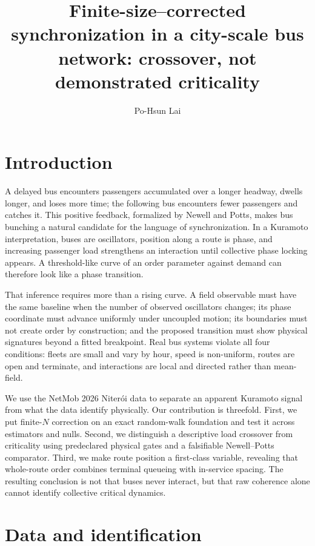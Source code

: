 \documentclass[9pt,twocolumn,twoside]{opticajnl}
\title{Finite-size--corrected synchronization in a city-scale bus network:
crossover, not demonstrated criticality}
\author[1,*]{Po-Hsun Lai}
\affil[1]{Department of Physics, National Taiwan University, Taipei, Taiwan}
\affil[*]{b11202025@ntu.edu.tw}
\begin{document}
\maketitle

\section{Introduction}

A delayed bus encounters passengers accumulated over a longer headway, dwells longer, and loses
more time; the following bus encounters fewer passengers and catches it.  This positive feedback,
formalized by Newell and Potts, makes bus bunching a natural candidate for the language of
synchronization.  In a Kuramoto interpretation, buses are oscillators, position along a route is
phase, and increasing passenger load strengthens an interaction until collective phase locking
appears.  A threshold-like curve of an order parameter against demand can therefore look like a
phase transition.

That inference requires more than a rising curve.  A field observable must have the same baseline
when the number of observed oscillators changes; its phase coordinate must advance uniformly under
uncoupled motion; its boundaries must not create order by construction; and the proposed transition
must show physical signatures beyond a fitted breakpoint.  Real bus systems violate all four
conditions: fleets are small and vary by hour, speed is non-uniform, routes are open and terminate,
and interactions are local and directed rather than mean-field.

We use the NetMob 2026 Niter\'oi data to separate an apparent Kuramoto signal from what the data
identify physically.  Our contribution is threefold.  First, we put finite-$N$ correction on an
exact random-walk foundation and test it across estimators and nulls.  Second, we distinguish a
descriptive load crossover from criticality using predeclared physical gates and a falsifiable
Newell--Potts comparator.  Third, we make route position a first-class variable, revealing that
whole-route order combines terminal queueing with in-service spacing.  The resulting conclusion is
not that buses never interact, but that raw coherence alone cannot identify collective critical
dynamics.

\section{Data and identification}
\end{document}
